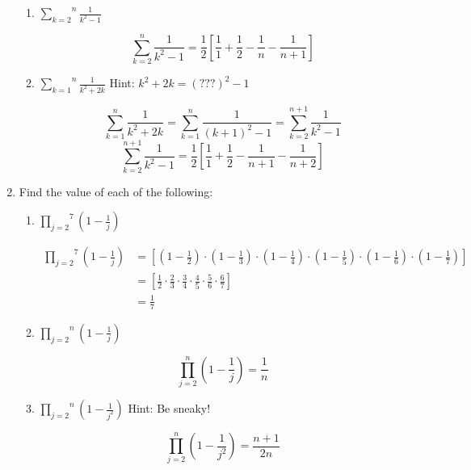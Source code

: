 \documentclass{article}
\def\inlinesum#1#2{\overset{#2}{\underset{#1}{\sum}}}
\def\inlineprod#1#2{\overset{#2}{\underset{#1}{\prod}}}
\begin{document}
\begin{enumerate}
\begin{enumerate}
  \item
    $\inlinesum{k=2}{n}\frac1{k^2-1}$

    $$\inlinesum{k=2}{n}\frac1{k^2-1}= \frac{1}{2}\left[\frac{1}{1}+\frac{1}{2} - \frac{1}{n} - \frac{1}{n+1}\right]$$

  \item
    $\inlinesum{k=1}{n}\frac1{k^2+2k}$
    \hspace{10pt}Hint: $k^2+2k=(???)^2-1$

    $$\inlinesum{k=1}{n} \frac{1}{k^2+2k} = \inlinesum{k=1}{n}\frac{1}{(k+1)^2 - 1} = \inlinesum{k=2}{n+1}\frac{1}{k^2 - 1}$$
    $$\inlinesum{k=2}{n+1}\frac{1}{k^2 - 1} = \frac{1}{2} \left[\frac{1}{1} + \frac{1}{2} - \frac{1}{n+1} - \frac{1}{n+2}\right]$$

  \end{enumerate}

\item
  Find the value of each of the following:

  \begin{enumerate}

  \item
    $\inlineprod{j=2}{7}\left(1-\frac1j\right)$

    \begin{align*}
      \inlineprod{j=2}{7}\left(1-\frac1j\right) &= \left[\left(1-\frac{1}{2}\right)\cdot \left(1-\frac{1}{3}\right)\cdot \left(1-\frac{1}{4}\right)\cdot \left(1-\frac{1}{5}\right)\cdot \left(1-\frac{1}{6}\right)\cdot \left(1-\frac{1}{7}\right)\right] \\
    &= \left[\frac{1}{2}\cdot\frac{2}{3}\cdot\frac{3}{4}\cdot\frac{4}{5}\cdot\frac{5}{6}\cdot\frac{6}{7}\right] \\
    &= \frac{1}{7}
    \end{align*}
    
  \item
    $\inlineprod{j=2}{n}\left(1-\frac1j\right)$

    $$\inlineprod{j=2}{n}\left(1-\frac1j\right) = \frac{1}{n}$$

  \item
    $\inlineprod{j=2}{n}\left(1-\frac1{j^2}\right)$
    \hspace{10pt}Hint: Be sneaky!

    $$\inlineprod{j=2}{n}\left(1-\frac1{j^2}\right) = \frac{n+1}{2n}$$

  \end{enumerate}


\end{enumerate}
\end{document}
